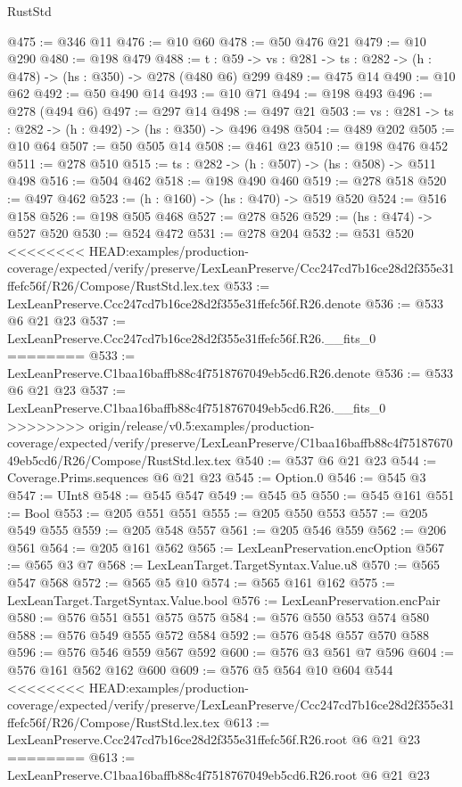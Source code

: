 \begin{lexlean}{RustStd}
\begin{coremodule}
{\begin{coremodule}
@475 := @346 @11
@476 := @10 @60
@478 := @50 @476 @21
@479 := @10 @290
@480 := @198 @479
@488 := {t : @59} -> {vs : @281} -> {ts : @282} -> (h : @478) -> (hs : @350) -> @278 (@480 @6) @299
@489 := @475 @14
@490 := @10 @62
@492 := @50 @490 @14
@493 := @10 @71
@494 := @198 @493
@496 := @278 (@494 @6)
@497 := @297 @14
@498 := @497 @21
@503 := {vs : @281} -> {ts : @282} -> (h : @492) -> (hs : @350) -> @496 @498
@504 := @489 @202
@505 := @10 @64
@507 := @50 @505 @14
@508 := @461 @23
@510 := @198 @476 @452
@511 := @278 @510
@515 := {ts : @282} -> (h : @507) -> (hs : @508) -> @511 @498
@516 := @504 @462
@518 := @198 @490 @460
@519 := @278 @518
@520 := @497 @462
@523 := (h : @160) -> (hs : @470) -> @519 @520
@524 := @516 @158
@526 := @198 @505 @468
@527 := @278 @526
@529 := (hs : @474) -> @527 @520
@530 := @524 @472
@531 := @278 @204
@532 := @531 @520
<<<<<<<< HEAD:examples/production-coverage/expected/verify/preserve/LexLeanPreserve/Ccc247cd7b16ce28d2f355e31ffefc56f/R26/Compose/RustStd.lex.tex
@533 := LexLeanPreserve.Ccc247cd7b16ce28d2f355e31ffefc56f.R26.denote
@536 := @533 @6 @21 @23
@537 := LexLeanPreserve.Ccc247cd7b16ce28d2f355e31ffefc56f.R26.__fits_0
========
@533 := LexLeanPreserve.C1baa16baffb88c4f7518767049eb5cd6.R26.denote
@536 := @533 @6 @21 @23
@537 := LexLeanPreserve.C1baa16baffb88c4f7518767049eb5cd6.R26.__fits_0
>>>>>>>> origin/release/v0.5:examples/production-coverage/expected/verify/preserve/LexLeanPreserve/C1baa16baffb88c4f7518767049eb5cd6/R26/Compose/RustStd.lex.tex
@540 := @537 @6 @21 @23
@544 := Coverage.Prims.sequences @6 @21 @23
@545 := Option.{0}
@546 := @545 @3
@547 := UInt8
@548 := @545 @547
@549 := @545 @5
@550 := @545 @161
@551 := Bool
@553 := @205 @551 @551
@555 := @205 @550 @553
@557 := @205 @549 @555
@559 := @205 @548 @557
@561 := @205 @546 @559
@562 := @206 @561
@564 := @205 @161 @562
@565 := LexLeanPreservation.encOption
@567 := @565 @3 @7
@568 := LexLeanTarget.TargetSyntax.Value.u8
@570 := @565 @547 @568
@572 := @565 @5 @10
@574 := @565 @161 @162
@575 := LexLeanTarget.TargetSyntax.Value.bool
@576 := LexLeanPreservation.encPair
@580 := @576 @551 @551 @575 @575
@584 := @576 @550 @553 @574 @580
@588 := @576 @549 @555 @572 @584
@592 := @576 @548 @557 @570 @588
@596 := @576 @546 @559 @567 @592
@600 := @576 @3 @561 @7 @596
@604 := @576 @161 @562 @162 @600
@609 := @576 @5 @564 @10 @604 @544
<<<<<<<< HEAD:examples/production-coverage/expected/verify/preserve/LexLeanPreserve/Ccc247cd7b16ce28d2f355e31ffefc56f/R26/Compose/RustStd.lex.tex
@613 := LexLeanPreserve.Ccc247cd7b16ce28d2f355e31ffefc56f.R26.root @6 @21 @23
========
@613 := LexLeanPreserve.C1baa16baffb88c4f7518767049eb5cd6.R26.root @6 @21 @23

\end{coremodule}}
\end{coremodule}
\end{lexlean}
